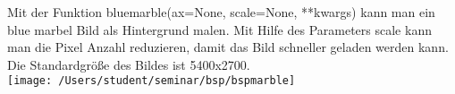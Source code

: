 Mit der Funktion \textsf{bluemarble(ax=None, scale=None, **kwargs)} kann man ein \textsf{blue marbel} Bild als Hintergrund malen. Mit Hilfe des Parameters \textsf{scale} kann man die Pixel Anzahl reduzieren, damit das Bild schneller geladen werden kann. Die Standardgröße des Bildes ist 5400x2700.\\

\texttt{[image: /Users/student/seminar/bsp/bspmarble]}